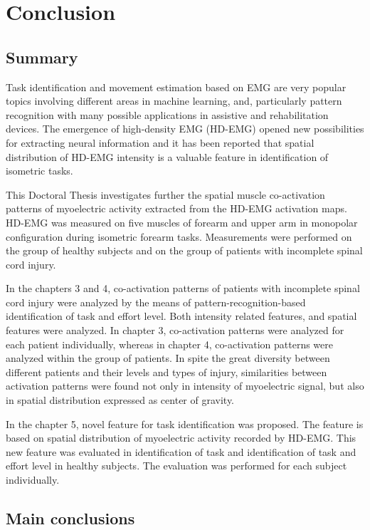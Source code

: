 \chapter{Conclusion}
\label{ch:conclusions}

\section{Summary}

Task identification and movement estimation based on EMG are very popular topics involving different areas in machine learning, and, particularly pattern recognition with many possible applications in assistive and rehabilitation devices. The emergence of high-density EMG (HD-EMG) opened new possibilities for extracting neural information and it has been reported that spatial distribution of HD-EMG intensity is a valuable feature in identification of isometric tasks.

This Doctoral Thesis investigates further the spatial muscle co-activation patterns of myoelectric activity extracted from the HD-EMG activation maps. HD-EMG was measured on five muscles of forearm and upper arm in monopolar configuration during isometric forearm tasks. Measurements were performed on the group of healthy subjects and on the group of patients with incomplete spinal cord injury.

In the chapters 3 and 4, co-activation patterns of patients with incomplete spinal cord injury were analyzed by the means of pattern-recognition-based identification of task and effort level. Both intensity related features, and spatial features were analyzed. In chapter 3, co-activation patterns were analyzed for each patient individually, whereas in chapter 4, co-activation patterns were analyzed within the group of patients. In spite the great diversity between different patients and their levels and types of injury, similarities between activation patterns were found not only in intensity of myoelectric signal, but also in spatial distribution expressed as center of gravity.

In the chapter 5, novel feature for task identification was proposed. The feature is based on spatial distribution of myoelectric activity recorded by HD-EMG. This new feature was evaluated in identification of task and identification of task and effort level in healthy subjects. The evaluation was performed for each subject individually. 


\section{Main conclusions}

